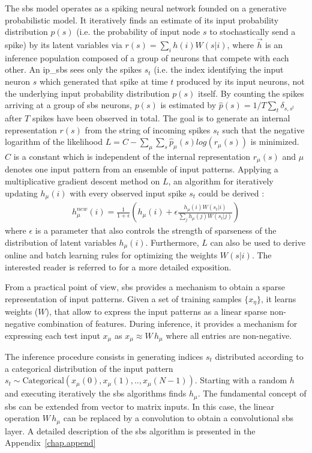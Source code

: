 The \gls{sbs} model operates as a spiking neural network founded on a generative probabilistic model. It iteratively finds an estimate of
its input probability distribution $p(s)$ (i.e. the probability of
input node $s$ to stochastically send a spike) by its latent variables
via $r(s) = \sum_i h(i) W(s|i)$, 
where $\vec{h}$ is an inference
population composed of a group of neurons that compete with each
other. An \gls{ip_sbs} sees only the spikes $s_t$ (i.e. the
index identifying the input neuron $s$ which generated that spike at
time $t$ produced by its input neurons, not the underlying input
probability distribution $p(s)$ itself. By counting the spikes
arriving at a group of \gls{sbs} neurons, $p(s)$ is estimated by
$\hat{p}(s) = 1/T \sum_t \delta_{s,s^t}$ after $T$ spikes have been
observed in total. The goal is to generate an internal representation
$r(s)$ from the string of incoming spikes $s_t$ such that the negative
logarithm of the likelihood
$L = C - \sum_\mu \sum_s \hat{p}_\mu(s) log\left( r_\mu(s) \right)$ is
minimized. $C$ is a constant which is independent of the internal
representation $r_\mu(s)$ and $\mu$ denotes one input pattern from an
ensemble of input patterns. Applying a multiplicative gradient descent
method on $L$, an algorithm for iteratively updating $h_\mu(i)$ with
every observed input spike $s_t$ could be derived
\cite{ernst2007efficient}:
\begin{eqnarray} \label{eq:sbs_update}
h_\mu^{new}(i) = \frac{1}{1+\epsilon} \left(h_\mu(i) + \epsilon \frac{h_\mu(i) W(s_t|i) }{\sum_j h_\mu(j) W(s_t|j)} \right) 
\end{eqnarray}
where $\epsilon$ is a parameter that also controls the strength of sparseness of the distribution of latent variables $h_\mu(i)$. Furthermore, $L$ can also be used to derive online and batch learning rules for optimizing the weights $W(s|i)$. The interested reader is referred to \cite{ernst2007efficient} for a more detailed exposition.

From a practical point of view, \gls{sbs} provides a mechanism to obtain a sparse representation of input patterns. Given a set of
training samples $\{x_\eta\}$, it learns weights ($W$), that allow
to express the input patterns as a linear sparse non-negative combination
of features.  During inference, it provides a mechanism for expressing
each test input $x_\mu$ as $x_\mu \approx W\, h_\mu$ where all
entries are non-negative.

The inference procedure consists in generating indices $s_t$
distributed according to a categorical distribution of the input pattern
$s_t \sim \mathrm{Categorical}(x_{\mu}(0), x_{\mu}(1), ..,
x_{\mu}(N-1))$. Starting with a random $h$ and executing
iteratively  the \gls{sbs} algorithms finds
$h_{\mu}$. The fundamental concept of \gls{sbs} can be extended from vector to matrix
inputs. In this case, the linear operation $W\, h_\mu$ can be replaced by a
convolution to obtain a convolutional \gls{sbs} layer. A detailed description of the \gls{sbs} algorithm is presented in the Appendix~\ref{chap.append}

